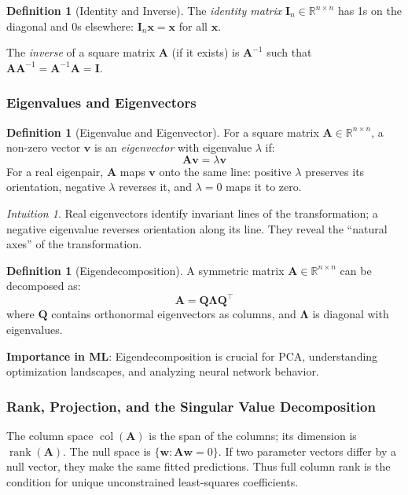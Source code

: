 \documentclass[11pt,twoside]{article}
\numberwithin{equation}{section}
\newcommand{\R}{\mathbb{R}}
\newcommand{\vect}[1]{\bm{#1}}
\newcommand{\mat}[1]{\bm{#1}}
\theoremstyle{plain}
\theoremstyle{definition}
\newtheorem{definition}[theorem]{Definition}
\theoremstyle{remark}
\newtheorem{intuition}[theorem]{Intuition}
\begin{document}
\begin{definition}[Identity and Inverse]
The \emph{identity matrix} $\mat{I}_n \in \R^{n \times n}$ has 1s on the diagonal and 0s elsewhere: $\mat{I}_n \vect{x} = \vect{x}$ for all $\vect{x}$.

The \emph{inverse} of a square matrix $\mat{A}$ (if it exists) is $\mat{A}^{-1}$ such that $\mat{A}\mat{A}^{-1} = \mat{A}^{-1}\mat{A} = \mat{I}$.
\end{definition}

\subsubsection{Eigenvalues and Eigenvectors}

\begin{definition}[Eigenvalue and Eigenvector]
For a square matrix $\mat{A} \in \R^{n \times n}$, a non-zero vector $\vect{v}$ is an \emph{eigenvector} with eigenvalue $\lambda$ if:
\[
\mat{A}\vect{v} = \lambda \vect{v}
\]
For a real eigenpair, $\mat{A}$ maps $\vect{v}$ onto the same line: positive $\lambda$ preserves its orientation, negative $\lambda$ reverses it, and $\lambda=0$ maps it to zero.
\end{definition}

\begin{intuition}
Real eigenvectors identify invariant lines of the transformation; a negative eigenvalue reverses orientation along its line. They reveal the ``natural axes'' of the transformation.
\end{intuition}

\begin{definition}[Eigendecomposition]
A symmetric matrix $\mat{A} \in \R^{n \times n}$ can be decomposed as:
\[
\mat{A} = \mat{Q}\mat{\Lambda}\mat{Q}^\top
\]
where $\mat{Q}$ contains orthonormal eigenvectors as columns, and $\mat{\Lambda}$ is diagonal with eigenvalues.
\end{definition}

\textbf{Importance in ML}: Eigendecomposition is crucial for PCA, understanding optimization landscapes, and analyzing neural network behavior.

\subsubsection{Rank, Projection, and the Singular Value Decomposition}
The column space $\operatorname{col}(\mat A)$ is the span of the columns; its dimension is $\operatorname{rank}(\mat A)$. The null space is $\{\vect w:\mat A\vect w=0\}$. If two parameter vectors differ by a null vector, they make the same fitted predictions. Thus full column rank is the condition for unique unconstrained least-squares coefficients.
\end{document}
